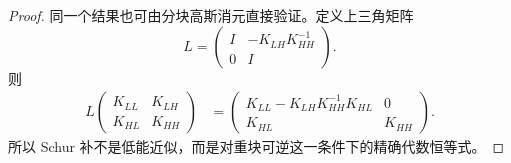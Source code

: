 \begin{proof}
同一个结果也可由分块高斯消元直接验证。定义上三角矩阵
\begin{equation*}
 L=
 \begin{pmatrix}
 I&-K_{LH}K_{HH}^{-1}\\
 0&I
 \end{pmatrix}.
\end{equation*}
则
\begin{align*}
 L
 \begin{pmatrix}
 K_{LL}&K_{LH}\\
 K_{HL}&K_{HH}
 \end{pmatrix}
 &=
 \begin{pmatrix}
 K_{LL}-K_{LH}K_{HH}^{-1}K_{HL}&0\\
 K_{HL}&K_{HH}
 \end{pmatrix}.
\end{align*}
所以 Schur 补不是低能近似，而是对重块可逆这一条件下的精确代数恒等式。


\end{proof}
